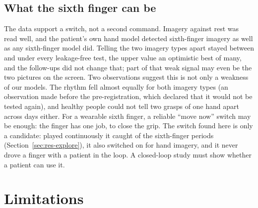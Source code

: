 \subsection{What the sixth finger can be}
The data support a switch, not a second command. Imagery against rest was read well, and
the patient's own hand model detected sixth-finger imagery as well as any sixth-finger
model did. Telling the two imagery types apart stayed between \pct{\rqOneCspLdaCvLeakfreeMean} and
\pct{\exFourAhSfEegnetEaFtMean} under every leakage-free test, the upper value an
optimistic best of many, and the follow-ups did not change that; part of that weak signal
may even be the two pictures on the screen. Two observations suggest this is not only a
weakness of our models. The rhythm fell almost equally for both imagery types (an
observation made before the pre-registration, which declared that it would not be tested
again), and healthy people could not tell two grasps of one hand apart across days
either. For a wearable sixth finger, a reliable ``move now'' switch may be enough: the
finger has one job, to close the grip. The switch found here is only a candidate: played
continuously it caught \pct{\exFiveFingerFingerOnMean} of the sixth-finger periods
(Section~\ref{sec:res-explore}), it also switched on for hand imagery, and it never drove a
finger with a patient in the loop. A closed-loop study must show whether a patient can use
it.

\section{Limitations}\label{sec:limits}

